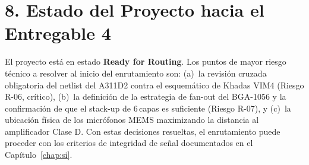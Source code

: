 \section{8. Estado del Proyecto hacia el Entregable 4}

El proyecto está en estado \textbf{Ready for Routing}. Los puntos de mayor riesgo técnico a resolver al inicio del enrutamiento son: (a)~la revisión cruzada obligatoria del netlist del A311D2 contra el esquemático de Khadas VIM4 (Riesgo R-06, crítico), (b)~la definición de la estrategia de fan-out del BGA-1056 y la confirmación de que el stack-up de 6\,capas es suficiente (Riesgo R-07), y (c)~la ubicación física de los micrófonos MEMS maximizando la distancia al amplificador Clase D. Con estas decisiones resueltas, el enrutamiento puede proceder con los criterios de integridad de señal documentados en el Capítulo~\ref{chap:si}.
